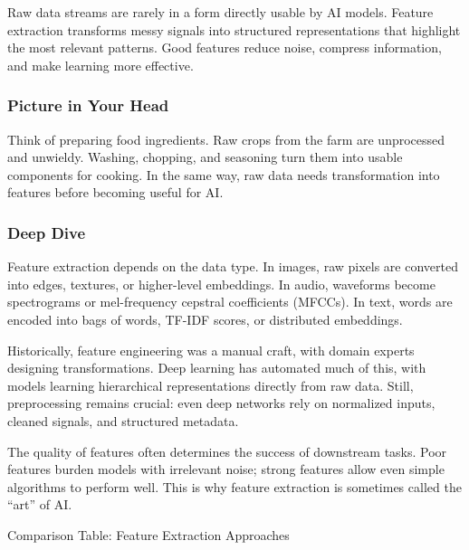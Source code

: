 \documentclass[
  letterpaper,
  DIV=11,
  numbers=noendperiod]{scrreprt}
\begin{document}
Raw data streams are rarely in a form directly usable by AI models.
Feature extraction transforms messy signals into structured
representations that highlight the most relevant patterns. Good features
reduce noise, compress information, and make learning more effective.

\subsubsection{Picture in Your Head}\label{picture-in-your-head-76}

Think of preparing food ingredients. Raw crops from the farm are
unprocessed and unwieldy. Washing, chopping, and seasoning turn them
into usable components for cooking. In the same way, raw data needs
transformation into features before becoming useful for AI.

\subsubsection{Deep Dive}\label{deep-dive-76}

Feature extraction depends on the data type. In images, raw pixels are
converted into edges, textures, or higher-level embeddings. In audio,
waveforms become spectrograms or mel-frequency cepstral coefficients
(MFCCs). In text, words are encoded into bags of words, TF-IDF scores,
or distributed embeddings.

Historically, feature engineering was a manual craft, with domain
experts designing transformations. Deep learning has automated much of
this, with models learning hierarchical representations directly from
raw data. Still, preprocessing remains crucial: even deep networks rely
on normalized inputs, cleaned signals, and structured metadata.

The quality of features often determines the success of downstream
tasks. Poor features burden models with irrelevant noise; strong
features allow even simple algorithms to perform well. This is why
feature extraction is sometimes called the ``art'' of AI.

Comparison Table: Feature Extraction Approaches
\end{document}
